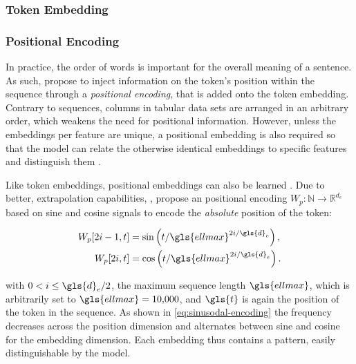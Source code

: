 \subsubsection{Token Embedding}\label{sec:token-embeddings}


\subsubsection{Positional Encoding}\label{sec:positional-encoding}

In practice, the order of words is important for the overall meaning of a sentence. As such, \textcite[][6]{vaswaniAttentionAllYou2017} propose to inject information on the token's position within the sequence through a \emph{positional encoding}, that is added onto the token embedding. Contrary to sequences, columns in tabular data sets are arranged in an arbitrary order, which weakens the need for positional information. However, unless the embeddings per feature are unique, a positional embedding is also required so that the model can relate the otherwise identical embeddings to specific features and distinguish them \autocites[][3]{huangTabTransformerTabularData2020}[][15]{somepalliSAINTImprovedNeural2021}.

Like token embeddings, positional embeddings can also be learned \autocite[cp.][4174]{devlinBERTPretrainingDeep2019}. Due to better, extrapolation capabilities, \textcite[][6]{vaswaniAttentionAllYou2017}, propose an positional encoding $W_p: \mathbb{N} \rightarrow \mathbb{R}^{d_{e}}$ based on sine and cosine signals to encode the \emph{absolute} position of the token:

\begin{equation}
\begin{aligned}
W_p[2 i-1, t] & =\sin \left(t / \gls{ellmax}^{2 i / \gls{d}_e}\right), \\
W_p[2 i, t] & =\cos \left(t / \gls{ellmax}^{2 i / \gls{d}_e}\right).
\end{aligned}
\label{eq:sinusodal-encoding}
\end{equation}

with $0<i \leq \gls{d}_{e} / 2$, the maximum sequence length $\gls{ellmax}$, which is arbitrarily set to $\gls{ellmax}=10{,}000$, and $\gls{t}$ is again the position of the token in the sequence. As shown in \cref{eq:sinusodal-encoding} the frequency decreases across the position dimension and alternates between sine and cosine for the embedding dimension. Each embedding thus contains a pattern, easily distinguishable by the model. 

